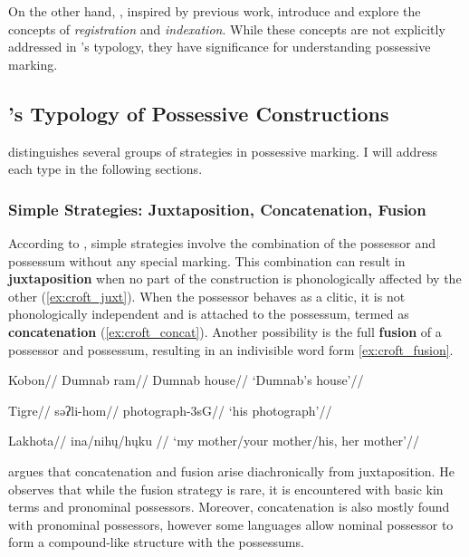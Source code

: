On the other hand, \cite{lander2020head}, inspired by previous work, introduce and explore the concepts of \textit{registration} and \textit{indexation}. While these concepts are not explicitly addressed in \citeauthor{nichols_locus_2013}'s \citeyear{nichols_locus_2013} typology, they have significance for understanding possessive marking.

\subsection{\citeauthor{croft2002typology}'s \citeyear{croft2002typology} Typology of Possessive Constructions}

\cite[31--42]{croft2002typology} distinguishes several groups of strategies in possessive marking. I will address each type in the following sections.

\subsubsection{Simple Strategies: Juxtaposition, Concatenation, Fusion}

According to \cite{croft2002typology}, simple strategies involve the combination of the possessor and possessum without any special marking. This combination can result in \textbf{juxtaposition} when no part of the construction is phonologically affected by the other (\ref{ex:croft_juxt}). When the possessor behaves as a clitic, it is not phonologically independent and is attached to the possessum, termed as \textbf{concatenation} (\ref{ex:croft_concat}). Another possibility is the full \textbf{fusion} of a possessor and possessum, resulting in an indivisible word form \ref{ex:croft_fusion}.

\pex
\a\label{ex:croft_juxt}
\begingl
\glpreamble Kobon//
\gla Dumnab ram//
\glb Dumnab house//
\glft `Dumnab's house'//
\endgl

\a\label{ex:croft_concat}
\begingl
\glpreamble Tigre//
\gla səʔli-hom//
\glb photograph-3sG//
\glft `his photograph'//
\endgl

\a\label{ex:croft_fusion}
\begingl
\glpreamble Lakhota//
\gla ina/nihų/hųku //
\glft `my mother/your mother/his, her mother'//
\endgl

\xe

\cite{croft2002typology} argues that concatenation and fusion arise diachronically from juxtaposition. He observes that while the fusion strategy is rare, it is encountered with basic kin terms and pronominal possessors. Moreover, concatenation is also mostly found with pronominal possessors, however some languages allow nominal possessor to form a compound-like structure with the possessums.

